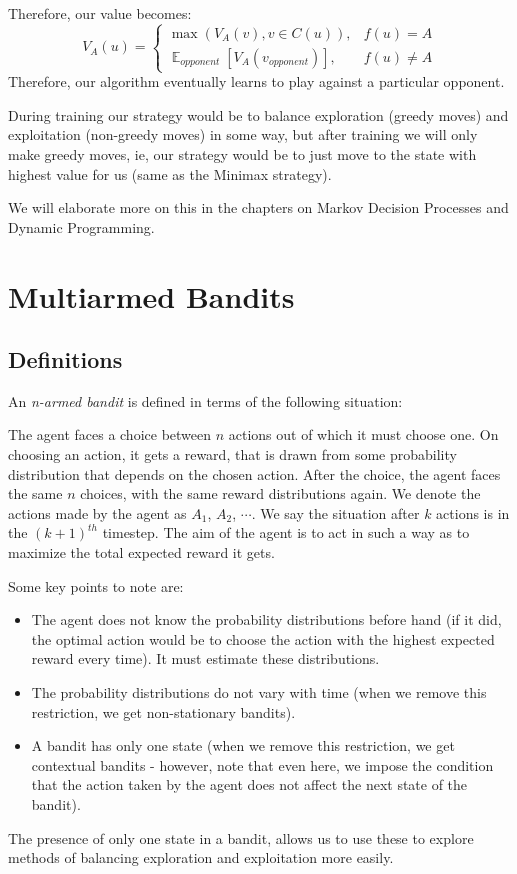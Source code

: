 \documentclass[12pt]{report}
\begin{document}
Therefore, our value becomes:
\begin{equation}
    V_{A}(u) = \begin{cases}
        \max(V_{A}(v), v \in C(u)), & f(u) = A\\
        \mathop{\mathbb{E}}_{opponent}\left[V_{A}(v_{opponent})\right], & f(u) \neq A
    \end{cases}
\end{equation}
Therefore, our algorithm eventually learns to play against a particular opponent.

During training our strategy would be to balance exploration (greedy moves) and exploitation (non-greedy moves) in some way, but after training
we will only make greedy moves, ie, our strategy would be to just move to the state with highest value for us (same as the Minimax strategy).

We will elaborate more on this in the chapters on Markov Decision Processes and Dynamic Programming.

\chapter{Multiarmed Bandits}
\section{Definitions}
An \textit{n-armed bandit} is defined in terms of the following situation:

The agent faces a choice between $n$ actions out of which it must choose one. On choosing an action, it gets a reward, that is drawn from some probability distribution that depends on the chosen action. 
After the choice, the agent faces the same $n$ choices, with the same reward distributions again. We denote the actions made by the agent as $A_{1}$, $A_{2}$, $\cdots$. We say the situation after $k$ actions is in the $(k+1)^{th}$ timestep.
The aim of the agent is to act in such a way as to maximize the total expected reward it gets.

Some key points to note are:
\begin{itemize}
    \item The agent does not know the probability distributions before hand (if it did, the optimal action would be to choose the action with the highest expected reward every time). It must estimate these distributions.
    \item The probability distributions do not vary with time (when we remove this restriction, we get non-stationary bandits).
    \item A bandit has only one state (when we remove this restriction, we get contextual bandits - however, note that even here, we impose the condition that the action taken by the agent does not affect the next state of the bandit).
\end{itemize}
The presence of only one state in a bandit, allows us to use these to explore methods of balancing exploration and exploitation more easily.
\end{document}
